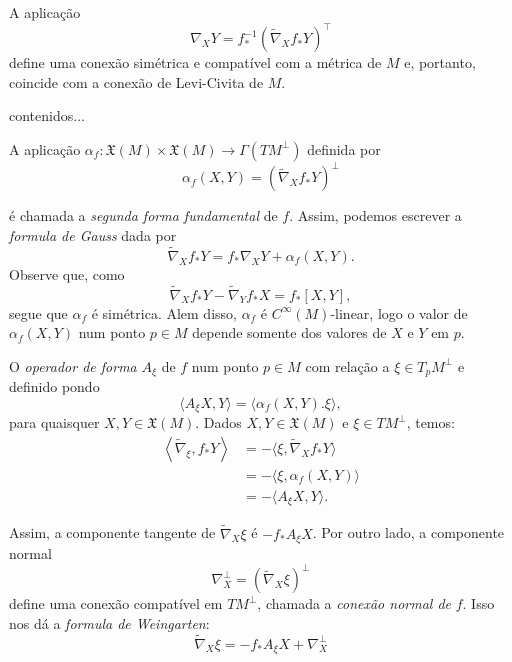 \begin{proposicao}
	A aplicação
	\begin{equation*}
		\nabla_X Y = f_*^{-1} \left( \tilde{\nabla}_X f_* Y \right)^{\top}
	\end{equation*}
	define uma conexão simétrica e compatível com a métrica de $M$ e, portanto, coincide com a conexão de Levi-Civita de $M$.
\end{proposicao}

\begin{demonstracao}
	contenidos...
\end{demonstracao}

A aplicação $\alpha_f: \mathfrak{X}(M) \times \mathfrak{X}(M) \rightarrow \Gamma(TM^\perp)$ definida por
\begin{equation*}
	\alpha_f(X,Y) = \left( \tilde{\nabla}_X f_* Y \right)^\perp
\end{equation*}

é chamada a \emph{segunda forma fundamental} de $f$. Assim, podemos escrever a \emph{formula de Gauss} dada por
\begin{equation*}
	\tilde{\nabla}_X f_* Y = f_* \nabla_X Y + \alpha_f(X,Y).
\end{equation*}
Observe que, como
\begin{equation*}
	\tilde{\nabla}_X f_* Y - \tilde{\nabla}_Y f_* X = f_* [X,Y],
\end{equation*}
segue que $\alpha_f$ é simétrica. Alem disso, $\alpha_f$ é $C^{\infty}(M)$-linear, logo o valor de $\alpha_f(X,Y)$ num ponto $p \in M$ depende somente dos valores de $X$ e $Y$ em $p$.

O \emph{operador de forma} $A_{\xi}$ de $f$ num ponto $p \in M$ com relação a $\xi \in T_p M^\perp$ e definido pondo
\begin{equation*}
	\langle A_\xi X, Y \rangle = \langle \alpha_f(X,Y). \xi \rangle,
\end{equation*}
para quaisquer $X,Y \in \mathfrak{X}(M)$. Dados $X,Y \in \mathfrak{X}(M)$ e $\xi \in TM^\perp$, temos:
\begin{align*}
	\left\langle \tilde{\nabla}_\xi, f_* Y \right\rangle &= -\langle \xi, \tilde{\nabla}_X f_* Y \rangle\\
	&= - \langle \xi, \alpha_f(X,Y) \rangle\\
	&= - \langle A_\xi X, Y \rangle.
\end{align*}

Assim, a componente tangente de $\tilde{\nabla}_X \xi$ é $-f_* A_\xi X$. Por outro lado, a componente normal
\begin{equation*}
	\nabla_X^\perp = \left( \tilde{\nabla}_X \xi \right)^\perp
\end{equation*}
define uma conexão compatível em $TM^\perp$, chamada a \emph{conexão normal de} $f$. Isso nos dá a \emph{formula de Weingarten}:
\begin{equation*}
	\tilde{\nabla}_X \xi = - f_* A_\xi X + \nabla_X^\perp
\end{equation*}